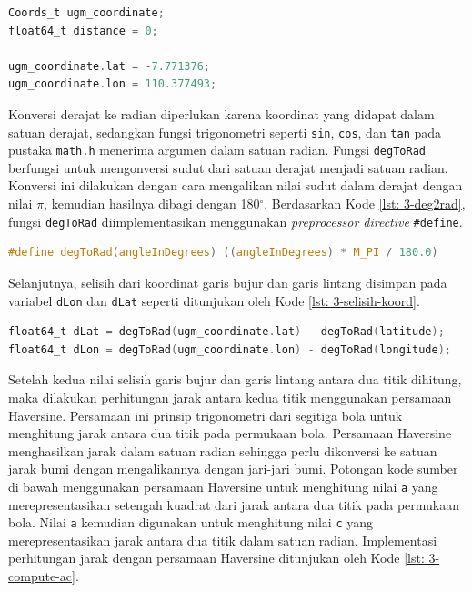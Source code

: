 \vspace{0.3cm}
\begin{lstlisting}[language=c, style=mystyle, caption={Inisiasi Struktur \texttt{ugm\_coordinate} dan Titik Pusat Geofencing}, label={lst: 3-define-geof}]
Coords_t ugm_coordinate;
float64_t distance = 0;

ugm_coordinate.lat = -7.771376;
ugm_coordinate.lon = 110.377493;
\end{lstlisting}

Konversi derajat ke radian diperlukan karena koordinat yang didapat dalam satuan derajat, sedangkan fungsi trigonometri seperti \texttt{sin}, \texttt{cos}, dan \texttt{tan} pada pustaka \texttt{math.h} menerima argumen dalam satuan radian. Fungsi  \texttt{degToRad} berfungsi untuk mengonversi sudut dari satuan derajat menjadi satuan radian. Konversi ini dilakukan dengan cara mengalikan nilai sudut dalam derajat dengan nilai $\pi$, kemudian hasilnya dibagi dengan 180$^{\circ}$. Berdasarkan Kode \ref{lst: 3-deg2rad}, fungsi \texttt{degToRad} diimplementasikan menggunakan \textit{preprocessor directive} \texttt{\#define}.

\vspace{0.3cm}
\begin{lstlisting}[language=c, style=mystyle, caption={Konversi Derajat ke Radian}, label={lst: 3-deg2rad}]
#define degToRad(angleInDegrees) ((angleInDegrees) * M_PI / 180.0)
\end{lstlisting}

Selanjutnya, selisih dari koordinat garis bujur dan garis lintang disimpan pada variabel \texttt{dLon} dan \texttt{dLat} seperti ditunjukan oleh Kode \ref{lst: 3-selisih-koord}.

\vspace{0.3cm}
\begin{lstlisting}[language=c, style=mystyle, caption={Selisih Koordinat Garis Lintand dan Garis Bujur}, label={lst: 3-selisih-koord}]
float64_t dLat = degToRad(ugm_coordinate.lat) - degToRad(latitude);
float64_t dLon = degToRad(ugm_coordinate.lon) - degToRad(longitude);
\end{lstlisting}

Setelah kedua nilai selisih garis bujur dan garis lintang antara dua titik dihitung, maka dilakukan perhitungan jarak antara kedua titik menggunakan persamaan Haversine. Persamaan ini prinsip trigonometri dari segitiga bola untuk menghitung jarak antara dua titik pada permukaan bola. Persamaan Haversine menghasilkan jarak dalam satuan radian sehingga perlu dikonversi ke satuan jarak bumi dengan mengalikannya dengan jari-jari bumi. Potongan kode sumber di bawah menggunakan persamaan Haversine untuk menghitung nilai \texttt{a} yang merepresentasikan setengah kuadrat dari jarak antara dua titik pada permukaan bola. Nilai \texttt{a} kemudian digunakan untuk menghitung nilai \texttt{c} yang merepresentasikan jarak antara dua titik dalam satuan radian. Implementasi perhitungan jarak dengan persamaan Haversine ditunjukan oleh Kode \ref{lst: 3-compute-ac}.

